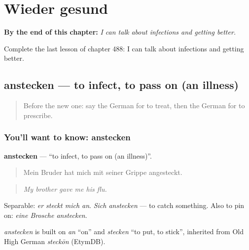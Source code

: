 
\chapter{Wieder gesund}
\label{ch:ge-wieder-gesund}

\begin{chapteropening}
\textbf{By the end of this chapter:} \emph{I can talk about infections and getting better.}

Complete the last lesson of chapter 488: I can talk about infections and getting better.
\end{chapteropening}

\section[anstecken]{anstecken — to infect, to pass on (an illness)}

\label{lesson:GE-C488-anstecken}



\begin{quote}
Before the new one: say the German for to treat, then the German for to prescribe.
\end{quote}

\subsection*{You'll want to know: anstecken}
\textbf{anstecken} — \textquotedblleft{}to infect, to pass on (an illness)\textquotedblright{}.

\begin{quote}
Mein Bruder hat mich mit seiner Grippe angesteckt.
\end{quote}

\begin{quote}
\emph{My brother gave me his flu.}
\end{quote}

Separable: \emph{er steckt mich an}. \emph{Sich anstecken} — to catch something. Also to pin on: \emph{eine Brosche anstecken}.

\begin{cousinweb}
\emph{anstecken} is built on \emph{an} \textquotedblleft{}on\textquotedblright{} and \emph{stecken} \textquotedblleft{}to put, to stick\textquotedblright{}, inherited from Old High German \emph{steckōn} (EtymDB).
\end{cousinweb}

